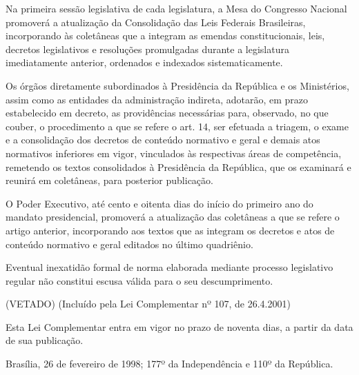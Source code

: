 \documentclass[calibri]{brlex2}
\begin{document}
\art Na primeira sessão legislativa de cada legislatura, a Mesa do Congresso Nacional promoverá a atualização da Consolidação das Leis Federais Brasileiras, incorporando às coletâneas que a integram as emendas constitucionais, leis, decretos legislativos e resoluções promulgadas durante a legislatura imediatamente anterior, ordenados e indexados sistematicamente.


\art Os órgãos diretamente subordinados à Presidência da República e os Ministérios, assim como as entidades da administração indireta, adotarão, em prazo estabelecido em decreto, as providências necessárias para, observado, no que couber, o procedimento a que se refere o art. 14, ser efetuada a triagem, o exame e a consolidação dos decretos de conteúdo normativo e geral e demais atos normativos inferiores em vigor, vinculados às respectivas áreas de competência, remetendo os textos consolidados à Presidência da República, que os examinará e reunirá em coletâneas, para posterior publicação.

\art O Poder Executivo, até cento e oitenta dias do início do primeiro ano do mandato presidencial, promoverá a atualização das coletâneas a que se refere o artigo anterior, incorporando aos textos que as integram os decretos e atos de conteúdo normativo e geral editados no último quadriênio.


\art Eventual inexatidão formal de norma elaborada mediante processo legislativo regular não constitui escusa válida para o seu descumprimento.

\artX (VETADO)     (Incluído pela Lei Complementar nº 107, de 26.4.2001)

\art Esta Lei Complementar entra em vigor no prazo de noventa dias, a partir da data de sua publicação.

Brasília, 26 de fevereiro de 1998; 177º da Independência e 110º da República.
\end{document}
